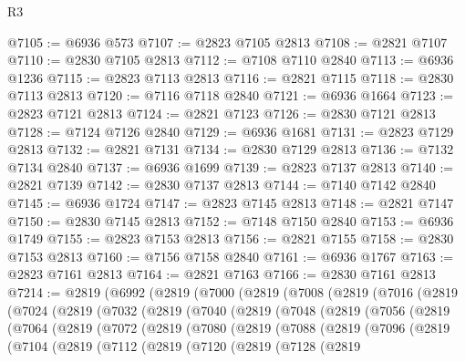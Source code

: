 \begin{lexlean}{R3}
\begin{coremodule}
@7105 := @6936 @573
@7107 := @2823 @7105 @2813
@7108 := @2821 @7107
@7110 := @2830 @7105 @2813
@7112 := @7108 @7110 @2840
@7113 := @6936 @1236
@7115 := @2823 @7113 @2813
@7116 := @2821 @7115
@7118 := @2830 @7113 @2813
@7120 := @7116 @7118 @2840
@7121 := @6936 @1664
@7123 := @2823 @7121 @2813
@7124 := @2821 @7123
@7126 := @2830 @7121 @2813
@7128 := @7124 @7126 @2840
@7129 := @6936 @1681
@7131 := @2823 @7129 @2813
@7132 := @2821 @7131
@7134 := @2830 @7129 @2813
@7136 := @7132 @7134 @2840
@7137 := @6936 @1699
@7139 := @2823 @7137 @2813
@7140 := @2821 @7139
@7142 := @2830 @7137 @2813
@7144 := @7140 @7142 @2840
@7145 := @6936 @1724
@7147 := @2823 @7145 @2813
@7148 := @2821 @7147
@7150 := @2830 @7145 @2813
@7152 := @7148 @7150 @2840
@7153 := @6936 @1749
@7155 := @2823 @7153 @2813
@7156 := @2821 @7155
@7158 := @2830 @7153 @2813
@7160 := @7156 @7158 @2840
@7161 := @6936 @1767
@7163 := @2823 @7161 @2813
@7164 := @2821 @7163
@7166 := @2830 @7161 @2813
@7214 := @2819
    (@6992
      (@2819
        (@7000
          (@2819
            (@7008
              (@2819
                (@7016
                  (@2819
                    (@7024
                      (@2819
                        (@7032
                          (@2819
                            (@7040
                              (@2819
                                (@7048
                                  (@2819
                                    (@7056
                                      (@2819
                                        (@7064
                                          (@2819
                                            (@7072
                                              (@2819
                                                (@7080
                                                  (@2819
                                                    (@7088
                                                      (@2819
                                                        (@7096
                                                          (@2819
                                                            (@7104
                                                              (@2819
                                                                (@7112
                                                                  (@2819
                                                                    (@7120
                                                                      (@2819
                                                                        (@7128
                                                                          (@2819

\end{coremodule}
\end{lexlean}
